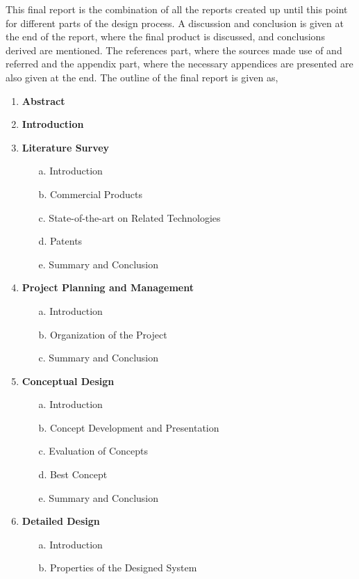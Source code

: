 \documentclass[12pt]{report}
\begin{document}
This final report is the combination of all the reports created up until this point for different parts of the design process. A discussion and conclusion is given at the end of the report, where the final product is discussed, and conclusions derived are mentioned. The references part, where the sources made use of and referred and the appendix part, where the necessary appendices are presented are also given at the end. The outline of the final report is given as,


\begin{enumerate}
    \item \textbf{Abstract}
    \item \textbf{Introduction}
    \item \textbf{Literature Survey}
    \begin{enumerate}
        \item[a.] Introduction
        \item[b.] Commercial Products
        \item[c.] State-of-the-art on Related Technologies
        \item[d.] Patents
        \item[e.] Summary and Conclusion
    \end{enumerate}
    \item \textbf{Project Planning and Management}
    \begin{enumerate}
        \item[a.] Introduction
        \item[b.] Organization of the Project
        \item[c.] Summary and Conclusion
    \end{enumerate}
    \item \textbf{Conceptual Design}
    \begin{enumerate}
        \item[a.] Introduction
        \item[b.] Concept Development and Presentation
        \item[c.] Evaluation of Concepts
        \item[d.] Best Concept
        \item[e.] Summary and Conclusion
    \end{enumerate}
    \item \textbf{Detailed Design}
    \begin{enumerate}
        \item[a.] Introduction
        \item[b.] Properties of the Designed System

\end{enumerate}
\end{enumerate}
\end{document}
